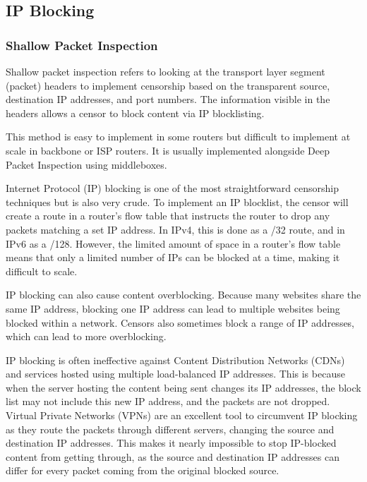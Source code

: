 \subsection{IP Blocking}

\subsubsection{Shallow Packet Inspection}

Shallow packet inspection refers to looking at the transport layer segment (packet) headers to implement censorship based on the transparent source, destination IP addresses, and port numbers. The information visible in the headers allows a censor to block content via IP blocklisting.

This method is easy to implement in some routers but difficult to implement at scale in backbone or ISP routers. It is usually implemented alongside Deep Packet Inspection using middleboxes.

Internet Protocol (IP) blocking is one of the most straightforward censorship techniques but is also very crude. To implement an IP blocklist, the censor will create a route in a router's flow table that instructs the router to drop any packets matching a set IP address. In IPv4, this is done as a /32 route, and in IPv6 as a /128. However, the limited amount of space in a router's flow table means that only a limited number of IPs can be blocked at a time, making it difficult to scale.

IP blocking can also cause content overblocking. Because many websites share the same IP address, blocking one IP address can lead to multiple websites being blocked within a network. Censors also sometimes block a range of IP addresses, which can lead to more overblocking.

IP blocking is often ineffective against Content Distribution Networks (CDNs) and services hosted using multiple load-balanced IP addresses. This is because when the server hosting the content being sent changes its IP addresses, the block list may not include this new IP address, and the packets are not dropped. Virtual Private Networks (VPNs) are an excellent tool to circumvent IP blocking as they route the packets through different servers, changing the source and destination IP addresses. This makes it nearly impossible to stop IP-blocked content from getting through, as the source and destination IP addresses can differ for every packet coming from the original blocked source.

